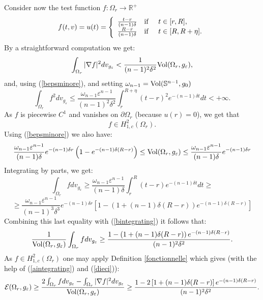 \documentclass[11pt, reqno]{amsart}
\theoremstyle{plain}
\begin{document}
Consider now the test function $f:\Omega_r\rightarrow {\mathbb{R}}^+$ 
$$f(t, v)=u(t)= \left\{\begin{array}{l}
\frac{t-r}{(n-1)\delta}\ \  \ {\rm if \ }\ \ \ t\in [r, R], \\
\frac{R-r}{(n-1)\delta} \ \ \ {\rm if \ }\ \ \ t\in [R, R+\eta].
\end{array}\right.$$
By a straightforward computation we get:
\begin{equation}\label{dieci}
\int_{\Omega_r}|\nabla f|^2dv_{g_\varepsilon}<\frac{1}{(n-1)^2\delta^2} {\rm Vol}(\Omega_r, g_\varepsilon), 
\end{equation}
and,  using  (\ref{bepsminore}), and setting $\omega_{n-1}={\rm Vol}(\mathbb S^{n-1}, g_0)$
$$\int_{\Omega_r} f^2dv_{g_{\varepsilon}}\leq \frac{\omega_{n-1}\varepsilon^{n-1}} {(n-1)^2\delta^2}\int_{r}^{R+\eta}(t-r)^2e^{-(n-1)\delta t}dt<+\infty .$$
As $f$ is piecewise $C^1$ and vanishes on $\partial\Omega_r$ (because $u(r)=0$), we get that 
\begin{equation}
f\in H_{1, c}^2(\Omega_r).
\end{equation}
Using  (\ref{bepsminore}) we also have:
\begin{equation}\label{bintegrating}
\frac{\omega_{n-1}\varepsilon^{n-1}}{(n-1)\delta}e^{-(n-1)\delta r}\left(1-e^{-(n-1)\delta(R-r)}\right)\leq {\rm Vol}(\Omega_r, g_\varepsilon)\leq 
\frac{\omega_{n-1}\varepsilon^{n-1}}{(n-1)\delta}e^{-(n-1)\delta r}
\end{equation}
Integrating by parts, we get:
$$\int_{\Omega_r}fdv_{g_{\varepsilon}}\geq \frac{\omega_{n-1}\varepsilon^{n-1}}{(n-1)\delta}\int_r^R(t-r)e^{-(n-1)\delta t}dt
\geq $$
$$\geq  \frac{\omega_{n-1}\varepsilon^{n-1}}{(n-1)^3\delta^3}e^{-(n-1)\delta r}\left[1-\left(1+(n-1)\delta (R-r)\right)e^{-(n-1)\delta (R-r)}\right]$$
Combining this last equality with (\ref{bintegrating}) it follows that:
\begin{equation}\label{aintegrating}
\frac{1}{{\rm Vol}(\Omega_r, g_\varepsilon)}\int_{\Omega_r}fdv_{g_{\varepsilon}}\geq \frac{1-\left(1+(n-1)\delta(R-r)\right)e^{-(n-1)\delta (R-r)}}{(n-1)^2\delta^2}.
\end{equation}
As $f\in H_{1, c}^2(\Omega_r)$ one may apply Definition  \ref{fonctionnelle} which gives (with the help of (\ref{aintegrating}) and (\ref{dieci})):
$${\mathcal E}(\Omega_r, g_{\varepsilon})\geq \frac{2\int_{\Omega_r}fdv_{g_\varepsilon}-
\int_{\Omega_r}|\nabla f|^2dv_{g_\varepsilon}}{{\rm Vol}(\Omega_r, g_\varepsilon)}
\geq \frac{1-2\left[1+(n-1)\delta(R-r)\right]e^{-(n-1)\delta (R-r)}}{(n-1)^2\delta^2}.$$
\end{document}
